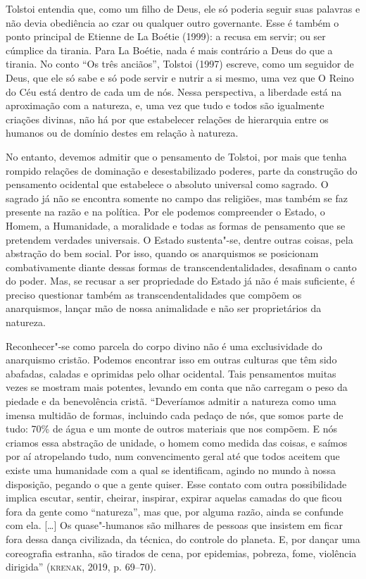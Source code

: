 Tolstoi entendia que, como um filho de Deus, ele só poderia seguir suas
palavras e não devia obediência ao czar ou qualquer outro governante.
Esse é também o ponto principal de Etienne de La Boétie (1999): a recusa
em servir; ou ser cúmplice da tirania. Para La Boétie, nada é mais
contrário a Deus do que a tirania. No conto ``Os três anciãos'', Tolstoi
(1997) escreve, como um seguidor de Deus, que ele só sabe e só pode
servir e nutrir a si mesmo, uma vez que O Reino do Céu está dentro de
cada um de nós. Nessa perspectiva, a liberdade está na aproximação com a
natureza, e, uma vez que tudo e todos são igualmente criações divinas,
não há por que estabelecer relações de hierarquia entre os humanos ou de
domínio destes em relação à natureza.

No entanto, devemos admitir que o pensamento de Tolstoi, por mais que
tenha rompido relações de dominação e desestabilizado poderes, parte da
construção do pensamento ocidental que estabelece o absoluto universal
como sagrado. O sagrado já não se encontra somente no campo das
religiões, mas também se faz presente na razão e na política. Por ele
podemos compreender o Estado, o Homem, a Humanidade, a moralidade e
todas as formas de pensamento que se pretendem verdades universais. O
Estado sustenta"-se, dentre outras coisas, pela abstração do bem social.
Por isso, quando os anarquismos se posicionam combativamente diante
dessas formas de transcendentalidades, desafinam o canto do poder. Mas,
se recusar a ser propriedade do Estado já não é mais suficiente, é
preciso questionar também as transcendentalidades que compõem os
anarquismos, lançar mão de nossa animalidade e não ser proprietários da
natureza.

Reconhecer"-se como parcela do corpo divino não é uma exclusividade do
anarquismo cristão. Podemos encontrar isso em outras culturas que têm
sido abafadas, caladas e oprimidas pelo olhar ocidental. Tais
pensamentos muitas vezes se mostram mais potentes, levando em conta que
não carregam o peso da piedade e da benevolência cristã. ``Deveríamos
admitir a natureza como uma imensa multidão de formas, incluindo cada
pedaço de nós, que somos parte de tudo: 70\% de água e um monte de
outros materiais que nos compõem. E nós criamos essa abstração de
unidade, o homem como medida das coisas, e saímos por aí atropelando
tudo, num convencimento geral até que todos aceitem que existe uma
humanidade com a qual se identificam, agindo no mundo à nossa
disposição, pegando o que a gente quiser. Esse contato com outra
possibilidade implica escutar, sentir, cheirar, inspirar, expirar
aquelas camadas do que ficou fora da gente como ``natureza'', mas que,
por alguma razão, ainda se confunde com ela. {[}\ldots{}{]} Os quase"-humanos
são milhares de pessoas que insistem em ficar fora dessa dança
civilizada, da técnica, do controle do planeta. E, por dançar uma
coreografia estranha, são tirados de cena, por epidemias, pobreza, fome,
violência dirigida'' (\textsc{krenak}, 2019, p. 69--70).

